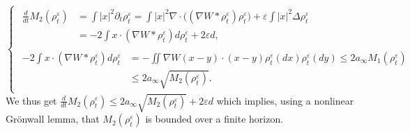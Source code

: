 \documentclass[11pt]{article}
\numberwithin{equation}{section}
\def\eps{\varepsilon}
\def\pa{\partial}
\theoremstyle{plain}
\theoremstyle{definition}
\begin{document}
\[
\begin{cases}
\begin{aligned}
\frac{d}{dt} M_2(\rho_t^\eps) &= \int |x|^2 \pa_t \rho_t^\eps = \int |x|^2 \nabla \cdot \big( (\nabla W * \rho_t^\eps) \rho_t^\eps \big) + \eps \int |x|^2 \Delta \rho_t^\eps \\
&= - 2 \int x \cdot (\nabla W * \rho_t^\eps) d\rho_t^\eps + 2\eps d,
\end{aligned}
\\
\begin{aligned}
- 2 \int x \cdot (\nabla W * \rho_t^\eps) d\rho_t^\eps &= - \iint \nabla W(x-y) \cdot (x-y) \rho_t^\eps(dx) \rho_t^\eps(dy) \leq 2 a_\infty M_1(\rho_t^\eps) \\
&\leq 2 a_\infty \sqrt{M_2(\rho_t^\eps)}.
\end{aligned}
\end{cases}
\]
We thus get $\frac{d}{dt} M_2(\rho_t^\eps) \leq 2 a_\infty \sqrt{M_2(\rho_t^\eps)} + 2\eps d$ which implies, using a nonlinear Grönwall lemma, that $M_2(\rho_t^\eps)$ is bounded over a finite horizon.
\end{document}
